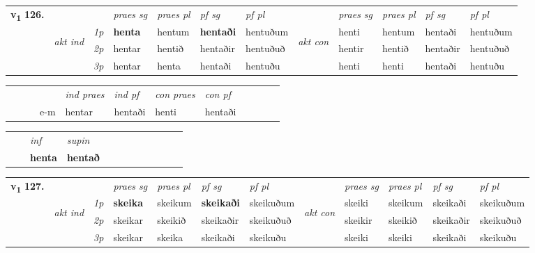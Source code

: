 \begin{tabular}{llllllllllll} \toprule
\multirow{4}{*}{{{\textbf{v{\textsubscript{1}}} \Large{\textbf{126.}}}}}  & &   &  \textit{praes sg}  & \textit{praes pl}  &\textit{ pf sg} & \textit{pf pl} &  &  \textit{praes sg}  & \textit{praes pl}  & \textit{pf sg} & \textit{pf pl } \\*
	\cmidrule{4-7} \cmidrule{9-12}
 & \multirow{3}{*}{\begin{turn}{90}\textit{akt ind}\end{turn}} & {\textit{1p}} & \textbf{henta} & hentum    & \textbf{hentaði} & hentuðum & \multirow{3}{*}{\begin{turn}{90}\textit{akt con}\end{turn}} &henti & hentum & hentaði & hentuðum\\*
& &  {\textit{2p}} &  hentar  & hentið   & hentaðir & hentuðuð & & hentir & hentið & hentaðir & hentuðuð \\*
& &  {\textit{3p}} & hentar & henta   & hentaði & hentuðu & & henti & henti& hentaði & hentuðu  \\*
\cmidrule{4-7} \cmidrule{9-12}
\end{tabular}


\begin{tabular}{llllllllllll}
 & &  & &  \textit{ind praes} & \textit{ind pf} & \textit{con praes} & \textit{con pf} \\*
&  & & e-m & hentar & hentaði & henti & hentaði \\*
\cmidrule{5-9}
\end{tabular}


\begin{tabular}{llllllllllll}
 & & \textit{inf}      & \textit{supin}       \\*
  & & \textbf{henta}       &  \textbf{hentað}   \\*
\cmidrule{1-12}
\end{tabular}



\begin{tabular}{llllllllllll} \toprule
\multirow{4}{*}{{{\textbf{v{\textsubscript{1}}} \Large{\textbf{127.}}}}}  & &   &  \textit{praes sg}  & \textit{praes pl}  &\textit{ pf sg} & \textit{pf pl} &  &  \textit{praes sg}  & \textit{praes pl}  & \textit{pf sg} & \textit{pf pl } \\*
	\cmidrule{4-7} \cmidrule{9-12}
 & \multirow{3}{*}{\begin{turn}{90}\textit{akt ind}\end{turn}} & {\textit{1p}} & \textbf{skeika} & skeikum    & \textbf{skeikaði} & skeikuðum & \multirow{3}{*}{\begin{turn}{90}\textit{akt con}\end{turn}} &skeiki & skeikum & skeikaði & skeikuðum\\*
& &  {\textit{2p}} &  skeikar  & skeikið   & skeikaðir & skeikuðuð & & skeikir & skeikið & skeikaðir & skeikuðuð \\*
& &  {\textit{3p}} & skeikar & skeika   & skeikaði & skeikuðu & & skeiki & skeiki& skeikaði & skeikuðu  \\*
\cmidrule{4-7} \cmidrule{9-12}
\end{tabular}


